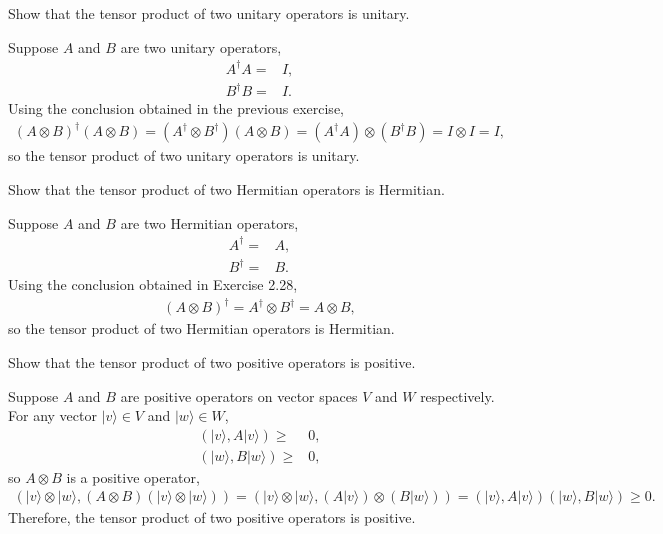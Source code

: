 \documentclass[en]{sol-man}
\begin{document}
\begin{exe}
    Show that the tensor product of two unitary operators is unitary.
\end{exe}
\begin{pf}
    Suppose $A$ and $B$ are two unitary operators,
    \begin{align}
        A^{\dagger}A=&I,\\
        B^{\dagger}B=&I.
    \end{align}
    Using the conclusion obtained in the previous exercise,
    \begin{align}
        (A\otimes B)^{\dagger}(A\otimes B)=(A^{\dagger}\otimes B^{\dagger})(A\otimes B)=(A^{\dagger}A)\otimes(B^{\dagger}B)=I\otimes I=I,
    \end{align}
    so the tensor product of two unitary operators is unitary.
\end{pf}

\begin{exe}
    Show that the tensor product of two Hermitian operators is Hermitian.
\end{exe}
\begin{pf}
    Suppose $A$ and $B$ are two Hermitian operators,
    \begin{align}
        A^{\dagger}=&A,\\
        B^{\dagger}=&B.
    \end{align}
    Using the conclusion obtained in Exercise 2.28,
    \begin{align}
        (A\otimes B)^{\dagger}=A^{\dagger}\otimes B^{\dagger}=A\otimes B,
    \end{align}
    so the tensor product of two Hermitian operators is Hermitian.
\end{pf}

\begin{exe}
    Show that the tensor product of two positive operators is positive.
\end{exe}
\begin{pf}
    Suppose $A$ and $B$ are positive operators on vector spaces $V$ and $W$ respectively. For any vector $\lvert v\rangle\in V$ and $\lvert w\rangle\in W$,
    \begin{align}
        (\lvert v\rangle,A\lvert v\rangle)\geq&0,\\
        (\lvert w\rangle,B\lvert w\rangle)\geq&0,
    \end{align}
    so $A\otimes B$ is a positive operator,
    \begin{align}
        (\lvert v\rangle\otimes\lvert w\rangle,(A\otimes B)(\lvert v\rangle\otimes\lvert w\rangle))=(\lvert v\rangle\otimes\lvert w\rangle,(A\lvert v\rangle)\otimes(B\lvert w\rangle))=(\lvert v\rangle,A\lvert v\rangle)(\lvert w\rangle,B\lvert w\rangle)\geq 0.
    \end{align}
    Therefore, the tensor product of two positive operators is positive.
\end{pf}
\end{document}
